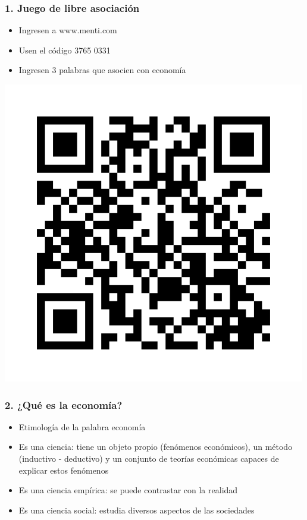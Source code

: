 \documentclass{beamer}
\begin{document}
\begin{frame}
\frametitle{1. Juego de libre asociación}
\begin{itemize}
    \item Ingresen a www.menti.com
    \item Usen el código 3765 0331 
    \item Ingresen 3 palabras que asocien con economía
\end{itemize} 
    \begin{center}
    \includegraphics[scale=0.3]{Figures/menti.png}
    \end{center}
\end{frame}

\begin{frame}
\frametitle{2. ¿Qu\'{e} es la economía?}
\begin{itemize}
    \item Etimología de la palabra economía 
    \item Es una ciencia: tiene un objeto propio (fenómenos económicos), un método (inductivo - deductivo) y un conjunto de teorías económicas capaces de explicar estos fenómenos
    \item Es una ciencia empírica: se puede contrastar con la realidad 
    \item Es una ciencia social: estudia diversos aspectos de las sociedades
    \vspace{2mm}
\end{itemize}
\end{frame}
\end{document}
